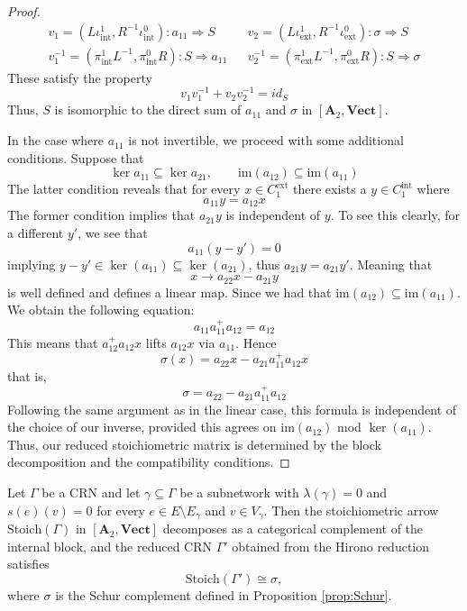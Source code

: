 \documentclass[11pt, one side, article]{memoir}
\begin{document}
\begin{proof}
    \begin{align*}
        v_1=(L\iota_{\textrm{int}}^1, R^{-1}\iota_{\textrm{int}}^0): a_{11}\Rightarrow S &&
        v_2=(L\iota_{\textrm{ext}}^1, R^{-1}\iota_{\textrm{ext}}^0): \sigma \Rightarrow S \\
        v_1^{-1}=(\pi_{\textrm{int}}^1L^{-1}, \pi_{\textrm{int}}^0R): S \Rightarrow a_{11} &&
        v_2^{-1}=(\pi_{\textrm{ext}}^1L^{-1}, \pi_{\textrm{ext}}^0R): S \Rightarrow \sigma
    \end{align*}
    These satisfy the property
    \begin{equation*}
        v_1v_1^{-1} + v_2v_2^{-1} = id_S
    \end{equation*}
    Thus, $S$ is isomorphic to the direct sum of $a_{11}$ and $\sigma$ in $[\mathbf{A}_2, \textbf{Vect}]$.

    \noindent In the case where $a_{11}$ is not invertible, we proceed with some additional conditions. Suppose that 
    \[
    \ker a_{11} \subseteq \ker a_{21}, \qquad \textrm{im}(a_{12})\subseteq \textrm{im}(a_{11})
    \]
    The latter condition reveals that for every $x \in C_{1}^{\textrm{ext}}$ there exists a $y \in C_1^{\textrm{int}}$ where 
    \[
    a_{11}y=a_{12}x
    \]
    The former condition implies that $a_{21}y$ is independent of $y$. To see this clearly, for a different $y'$, we see that 
    \[
    a_{11}(y-y') = 0
    \]
    implying $y - y' \in \ker (a_{11}) \subseteq \ker (a_{21})$, thus $a_{21}y = a_{21}y'$. Meaning that 
    \[
    x \longrightarrow a_{22}x - a_{21}y
    \]
    is well defined and defines a linear map.
    Since we had that $\textrm{im}(a_{12}) \subseteq \textrm{im}(a_{11})$. We obtain the following equation:
    \[
    a_{11}a_{11}^{+}a_{12} = a_{12}
    \]
    This means that $a_{12}^{+}a_{12}x$ lifts $a_{12}x$ via $a_{11}$. Hence
    \[
    \sigma (x) = a_{22}x - a_{21}a_{11}^{+}a_{12}x
    \]
    that is,
    \[
    \sigma = a_{22} - a_{21}a_{11}^{+}a_{12}
    \]
    Following the same argument as in the linear case, this formula is independent of the choice of our inverse, provided this agrees on $\textrm{im}(a_{12})$ mod $\ker (a_{11})$. Thus, our reduced stoichiometric matrix is determined by the block decomposition and the compatibility conditions.
\end{proof}
\begin{theorem}\label{thm:Cat_Schur}
    Let $\Gamma$ be a CRN and let $\gamma\subseteq \Gamma$ be a subnetwork with  $\lambda(\gamma)=0$ and $s(e)(v)=0$ for every $e \in E\setminus E_\gamma$ and $v \in V_\gamma$. Then the stoichiometric arrow $\mathrm{Stoich}(\Gamma)$ in $[\mathbf{A}_2,\mathbf{Vect}]$ decomposes as a categorical complement of the internal block, and the reduced CRN $\Gamma'$ obtained from the Hirono reduction satisfies
\[
\mathrm{Stoich}(\Gamma') \cong \sigma,
\]
where $\sigma$ is the Schur complement defined in Proposition \ref{prop:Schur}.
\end{theorem}
\end{document}
